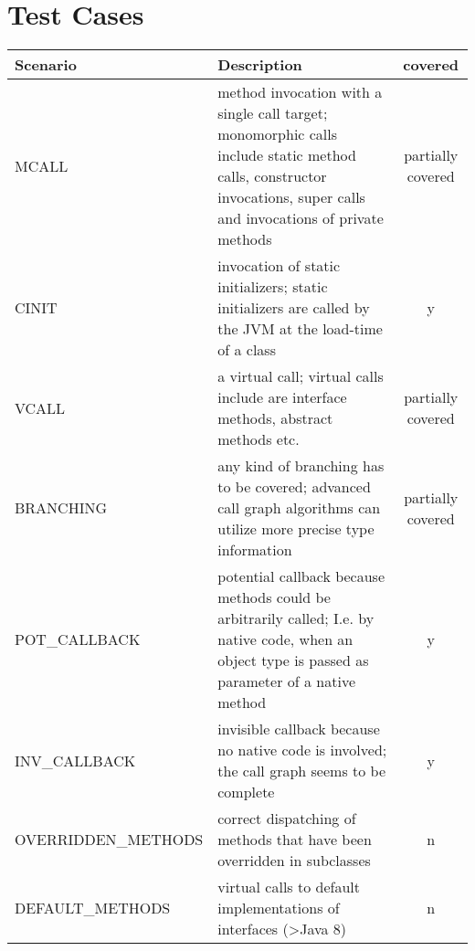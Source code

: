 \section{Test Cases}
\label{section:cornercases}

\begin{table}[htpb]
	\small
	\setlength{\tabcolsep}{5pt}
	\begin{tabularx}{\textwidth}{ X X c}
		\toprule
		\textbf{Scenario}    & \textbf{Description}                                                                                                                                                & \textbf{covered}  \\ \midrule
		MCALL                & method invocation with a single call target; monomorphic calls include static method calls, constructor invocations, super calls and invocations of private methods & partially covered \\
		CINIT                & invocation of static initializers; static initializers are called by the JVM at the load-time of a class                                                            & y                 \\
		VCALL                & a virtual call; virtual calls include are interface methods, abstract methods etc.                                                                                  & partially covered \\
		BRANCHING            & any kind of branching has to be covered; advanced call graph algorithms can utilize more precise type information                                                   & partially covered \\
		POT\_CALLBACK        & potential callback because methods could be arbitrarily called; I.e. by native code, when an object type is passed as parameter of a native method                  & y                 \\
		INV\_CALLBACK        & invisible callback because no native code is involved; the call graph seems to be complete                                                                          & y                 \\
		OVERRIDDEN\_METHODS  & correct dispatching of methods that have been overridden in subclasses                                                                                              & n                 \\
		DEFAULT\_METHODS     & virtual calls to default implementations of interfaces (\textgreater Java 8)                                                                                        & n                 \\

\end{tabularx}
\end{table}

